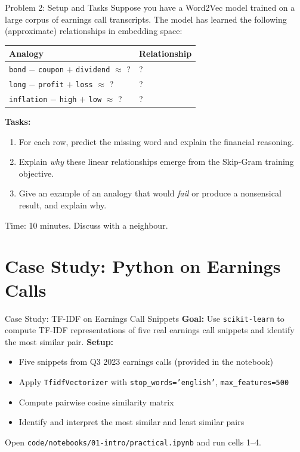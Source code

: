 \documentclass[9pt,t]{beamer}
\begin{document}
\begin{frame}{Problem 2: Setup and Tasks}
  Suppose you have a Word2Vec model trained on a large corpus of earnings call transcripts.
  The model has learned the following (approximate) relationships in embedding space:

  \begin{center}
  \begin{tabular}{@{}ll@{}}
    \toprule
    Analogy & Relationship \\
    \midrule
    \texttt{bond} $-$ \texttt{coupon} $+$ \texttt{dividend} $\approx$ ? & ? \\
    \texttt{long} $-$ \texttt{profit} $+$ \texttt{loss} $\approx$ ? & ? \\
    \texttt{inflation} $-$ \texttt{high} $+$ \texttt{low} $\approx$ ? & ? \\
    \bottomrule
  \end{tabular}
  \end{center}
  \medskip
  \textbf{Tasks:}
  \begin{enumerate}
    \item For each row, predict the missing word and explain the financial reasoning.
    \item Explain \emph{why} these linear relationships emerge from the Skip-Gram training objective.
    \item Give an example of an analogy that would \emph{fail} or produce a nonsensical result,
          and explain why.
  \end{enumerate}
  \medskip
  \small Time: 10 minutes. Discuss with a neighbour.
\end{frame}

\section{Case Study: Python on Earnings Calls}

\begin{frame}{Case Study: TF-IDF on Earnings Call Snippets}
  \textbf{Goal:} Use \texttt{scikit-learn} to compute TF-IDF representations
  of five real earnings call snippets and identify the most similar pair.
  \medskip
  \textbf{Setup:}
  \begin{itemize}
    \item Five snippets from Q3 2023 earnings calls (provided in the notebook)
    \item Apply \texttt{TfidfVectorizer} with \texttt{stop\_words='english'}, \texttt{max\_features=500}
    \item Compute pairwise cosine similarity matrix
    \item Identify and interpret the most similar and least similar pairs
  \end{itemize}
  \medskip
  Open \texttt{code/notebooks/01-intro/practical.ipynb} and run cells 1--4.
\end{frame}
\end{document}
